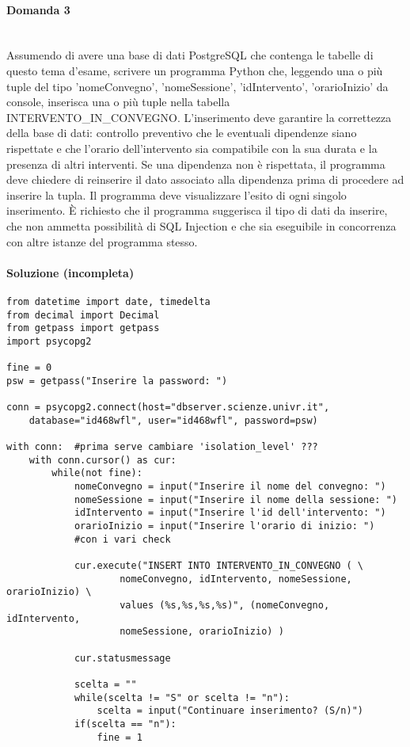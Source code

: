 \documentclass[a4paper, 10pt, titlepage]{article}
\begin{document}
\paragraph{Domanda 3}\dotfill
\\Assumendo di avere una base di dati PostgreSQL che contenga le tabelle di questo tema d'esame, scrivere un programma Python che, leggendo una o più tuple del tipo 'nomeConvegno', 'nomeSessione', 'idIntervento', 'orarioInizio' da console, inserisca una o più tuple nella tabella INTERVENTO\_IN\_CONVEGNO. L'inserimento deve garantire la correttezza della base di dati: controllo preventivo che le eventuali dipendenze siano rispettate e che l'orario dell'intervento sia compatibile con la sua durata e la presenza di altri interventi. Se una dipendenza non è rispettata, il programma deve chiedere di reinserire il dato associato alla dipendenza prima di procedere ad inserire la tupla. Il programma deve visualizzare l'esito di ogni singolo inserimento. È richiesto che il programma suggerisca il tipo di dati da inserire, che non ammetta possibilità di SQL Injection e che sia eseguibile in concorrenza con altre istanze del programma stesso.

\paragraph{Soluzione (incompleta)}\dotfill
\lstset{language=Python}
\begin{lstlisting}[tabsize=2]
from datetime import date, timedelta
from decimal import Decimal
from getpass import getpass
import psycopg2

fine = 0
psw = getpass("Inserire la password: ")
    
conn = psycopg2.connect(host="dbserver.scienze.univr.it",
	database="id468wfl", user="id468wfl", password=psw)
	
with conn:	#prima serve cambiare 'isolation_level' ???
	with conn.cursor() as cur:
		while(not fine):
			nomeConvegno = input("Inserire il nome del convegno: ")
			nomeSessione = input("Inserire il nome della sessione: ")
			idIntervento = input("Inserire l'id dell'intervento: ")
			orarioInizio = input("Inserire l'orario di inizio: ")
			#con i vari check
			
			cur.execute("INSERT INTO INTERVENTO_IN_CONVEGNO ( \ 	
					nomeConvegno, idIntervento, nomeSessione, orarioInizio) \
					values (%s,%s,%s,%s)", (nomeConvegno, idIntervento, 
					nomeSessione, orarioInizio) )
			
			cur.statusmessage
			
			scelta = ""
			while(scelta != "S" or scelta != "n"):
				scelta = input("Continuare inserimento? (S/n)")
			if(scelta == "n"):
				fine = 1
				

\end{lstlisting}
\end{document}

